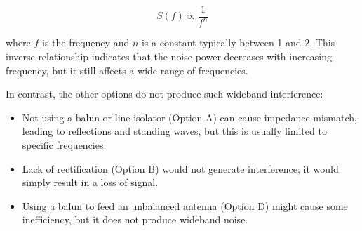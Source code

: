 \[
S(f) \propto \frac{1}{f^n}
\]

where \( f \) is the frequency and \( n \) is a constant typically between 1 and 2. This inverse relationship indicates that the noise power decreases with increasing frequency, but it still affects a wide range of frequencies.

In contrast, the other options do not produce such wideband interference:
\begin{itemize}
    \item Not using a balun or line isolator (Option A) can cause impedance mismatch, leading to reflections and standing waves, but this is usually limited to specific frequencies.
    \item Lack of rectification (Option B) would not generate interference; it would simply result in a loss of signal.
    \item Using a balun to feed an unbalanced antenna (Option D) might cause some inefficiency, but it does not produce wideband noise.
\end{itemize}

